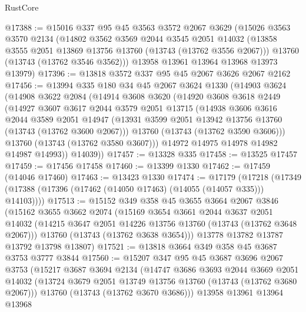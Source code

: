 \begin{lexlean}{RustCore}
\begin{coremodule}
@17388 := @15016
    @337
    @95
    @45
    @3563
    @3572
    @2067
    @3629
    (@15026
      @3563
      @3570
      @2134
      (@14802
        @3562
        @3569
        @2044
        @3545
        @2051
        @14032
        (@13858 @3555 @2051 @13869 @13756 @13760 (@13743 (@13762 @3556 @2067)))
        @13760
        (@13743 (@13762 @3546 @3562)))
      @13958
      @13961
      @13964
      @13968
      @13973
      @13979)
@17396 := @13818 @3572 @337 @95 @45 @2067 @3626 @2067 @2162
@17456 := @13994
    @335
    @180
    @34
    @45
    @2067
    @3624
    @1330
    (@14903
      @3624
      (@14908
        @3622
        @2084
        (@14914
          @3608
          @3620
          (@14920
            @3608
            @3618
            @2449
            (@14927
              @3607
              @3617
              @2044
              @3579
              @2051
              @13715
              (@14938
                @3606
                @3616
                @2044
                @3589
                @2051
                @14947
                (@13931 @3599 @2051 @13942 @13756 @13760 (@13743 (@13762 @3600 @2067)))
                @13760
                (@13743 (@13762 @3590 @3606)))
              @13760
              (@13743 (@13762 @3580 @3607)))
            @14972
            @14975
            @14978
            @14982
            @14987
            @14993))
        @14039))
@17457 := @13328 @335
@17458 := @13525 @17457
@17459 := @17456 @17458
@17460 := @13399 @1330
@17462 := @17459 (@14046 @17460)
@17463 := @13423 @1330
@17474 := @17179
    (@17218 (@17349 (@17388 (@17396 (@17462 (@14050 @17463) (@14055 (@14057 @335))) @14103))))
@17513 := @15152
    @349
    @358
    @45
    @3655
    @3664
    @2067
    @3846
    (@15162
      @3655
      @3662
      @2074
      (@15169
        @3654
        @3661
        @2044
        @3637
        @2051
        @14032
        (@14215 @3647 @2051 @14226 @13756 @13760 (@13743 (@13762 @3648 @2067)))
        @13760
        (@13743 (@13762 @3638 @3654)))
      @13778
      @13782
      @13787
      @13792
      @13798
      @13807)
@17521 := @13818 @3664 @349 @358 @45 @3687 @3753 @3777 @3844
@17560 := @15207
    @347
    @95
    @45
    @3687
    @3696
    @2067
    @3753
    (@15217
      @3687
      @3694
      @2134
      (@14747
        @3686
        @3693
        @2044
        @3669
        @2051
        @14032
        (@13724 @3679 @2051 @13749 @13756 @13760 (@13743 (@13762 @3680 @2067)))
        @13760
        (@13743 (@13762 @3670 @3686)))
      @13958
      @13961
      @13964
      @13968

\end{coremodule}
\end{lexlean}
